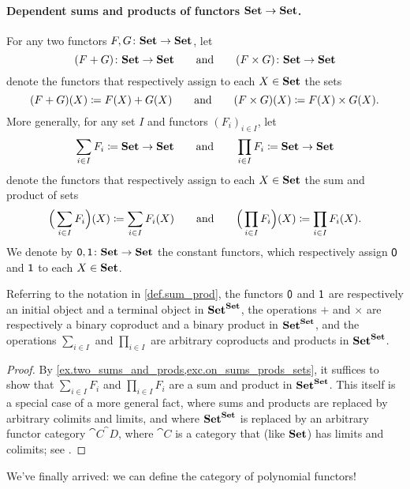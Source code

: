 \documentclass[DynamicalBook]{subfiles}
\begin{document}
\paragraph{Dependent sums and products of functors $\textbf{Set}\to\textbf{Set}$.}

\begin{definition}\label{def.sum_prod}
For any two functors $F,G\colon\textbf{Set}\to\textbf{Set}$, let
\[
  (F+G)\colon\textbf{Set}\to\textbf{Set}
  \qquad\text{and}\qquad
  (F\times G)\colon\textbf{Set}\to\textbf{Set}
\]
denote the functors that respectively assign to each $X\in\textbf{Set}$ the sets
\[
  (F+G)(X)\coloneqq F(X)+G(X)
  \qquad\text{and}\qquad
	(F\times G)(X)\coloneqq F(X)\times G(X).
\]
More generally, for any set $I$ and functors $(F_i)_{i\in I}$, let
\[
\sum_{i\in I}F_i\coloneq\textbf{Set}\to\textbf{Set}
\qquad\text{and}\qquad
\prod_{i\in I}F_i\coloneq\textbf{Set}\to\textbf{Set}
\]
denote the functors that respectively assign to each $X\in\textbf{Set}$ the sum and product of sets
\[
	\Big(\sum_{i\in I}F_i\Big)(X)\coloneqq\sum_{i\in I} F_i(X)
	\qquad\text{and}\qquad
	\Big(\prod_{i\in I}F_i\Big)(X)\coloneqq\prod_{i\in I} F_i(X).
\]
We denote by $\textsf{0},\textsf{1}\colon\textbf{Set}\to\textbf{Set}$ the constant functors, which respectively assign $\textsf{0}$ and $\textsf{1}$ to each $X\in\textbf{Set}$.
\end{definition}

\begin{proposition}
Referring to the notation in \cref{def.sum_prod}, the functors $\textsf{0}$ and $\textsf{1}$ are respectively an initial object and a terminal object in $\textbf{Set}^{\textbf{Set}}$, the operations $+$ and $\times$ are respectively a binary coproduct and a binary product in $\textbf{Set}^{\textbf{Set}}$, and the operations $\sum_{i\in I}$ and $\prod_{i\in I}$ are arbitrary coproducts and products in $\textbf{Set}^{\textbf{Set}}$.
\end{proposition}
\begin{proof}
By \cref{ex.two_sums_and_prods,exc.on_sums_prods_sets}, it suffices to show that $\sum_{i\in I}F_i$ and $\prod_{i\in I}F_i$ are a sum and product in $\textbf{Set}^{\textbf{Set}}$. This itself is a special case of a more general fact, where sums and products are replaced by arbitrary colimits and limits, and where $\textbf{Set}^{\textbf{Set}}$ is replaced by an arbitrary functor category $\cat{C}^\cat{D}$, where $\cat{C}$ is a category that (like $\textbf{Set}$) has limits and colimits; see \cite[page 22 -- 23, displays (24) and (25)]{macLane1992sheaves}.
\end{proof}

We've finally arrived: we can define the category of polynomial functors!
\end{document}
